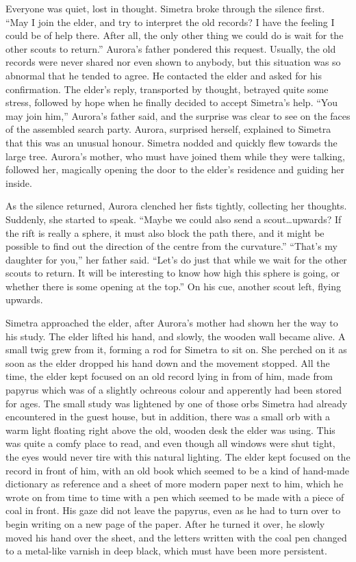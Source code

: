 Everyone was quiet, lost in thought. Simetra broke through the silence first. \enquote{May I join the elder, and try to interpret the old records? I have the feeling I could be of help there. After all, the only other thing we could do is wait for the other scouts to return.} Aurora's father pondered this request. Usually, the old records were never shared nor even shown to anybody, but this situation was so abnormal that he tended to agree. He contacted the elder and asked for his confirmation. The elder's reply, transported by thought, betrayed quite some stress, followed by hope when he finally decided to accept Simetra's help. \enquote{You may join him,} Aurora's father said, and the surprise was clear to see on the faces of the assembled search party. Aurora, surprised herself, explained to Simetra that this was an unusual honour. Simetra nodded and quickly flew towards the large tree. Aurora's mother, who must have joined them while they were talking, followed her, magically opening the door to the elder's residence and guiding her inside.

As the silence returned, Aurora clenched her fists tightly, collecting her thoughts. Suddenly, she started to speak. \enquote{Maybe we could also send a scout\dots upwards? If the rift is really a sphere, it must also block the path there, and it might be possible to find out the direction of the centre from the curvature.} \enquote{That's my daughter for you,} her father said. \enquote{Let's do just that while we wait for the other scouts to return. It will be interesting to know how high this sphere is going, or whether there is some opening at the top.} On his cue, another scout left, flying upwards.

\fancybreaker{}

Simetra approached the elder, after Aurora's mother had shown her the way to his study. The elder lifted his hand, and slowly, the wooden wall became alive. A small twig grew from it, forming a rod for Simetra to sit on. She perched on it as soon as the elder dropped his hand down and the movement stopped. All the time, the elder kept focused on an old record lying in from of him, made from papyrus which was of a slightly ochreous colour and apperently had been stored for ages. The small study was lightened by one of those orbs Simetra had already encountered in the guest house, but in addition, there was a small orb with a warm light floating right above the old, wooden desk the elder was using. This was quite a comfy place to read, and even though all windows were shut tight, the eyes would never tire with this natural lighting. The elder kept focused on the record in front of him, with an old book which seemed to be a kind of hand-made dictionary as reference and a sheet of more modern paper next to him, which he wrote on from time to time with a pen which seemed to be made with a piece of coal in front. His gaze did not leave the papyrus, even as he had to turn over to begin writing on a new page of the paper. After he turned it over, he slowly moved his hand over the sheet, and the letters written with the coal pen changed to a metal-like varnish in deep black, which must have been more persistent. 

